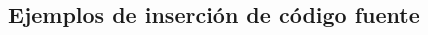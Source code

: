 	\lipsum[2]

	\begin{multicols}{2}

		\lipsum[4]

		
		\lipsum[5]

	\end{multicols}

\subsection{Ejemplos de inserción de código fuente}

	\newcommand{\insertsrcmanual}[2]{\href{https://latex.ppizarror.com/informe.html?srctype=#1\#hlp-srccode}{#2}}


